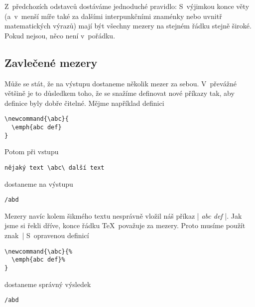 \documentclass[oldcsbabel]{csbulletin}
\def\emph#1{{\sl#1\/}}
\begin{document}
Z~předchozích odstavců dostáváme jednoduché pravidlo: S~výjimkou konce věty (a~v~menší míře také za dalšími interpunkčními znaménky nebo uvnitř matematických výrazů) mají být všechny mezery na stejném řádku stejně široké. Pokud nejsou, něco není v~pořádku.

\subsection{Zavlečené mezery}

Může se stát, že na výstupu dostaneme několik mezer za sebou. V~převážné většině je to důsledkem toho, že se snažíme definovat nové příkazy tak, aby definice byly dobře čitelné. Mějme například definici
\begin{Verbatim}
\newcommand{\abc}{
  \emph{abc def}
}
\end{Verbatim}
Potom při vstupu
\begin{Verbatim}
nějaký text \abc\ další text
\end{Verbatim}
dostaneme na výstupu
\begingroup
\newcommand{\abc}{
  \emph{abc def}
}%
\def\abd{\hbox{\rm
nějaký text \abc\ další text
  \unskip}}%
\begin{Verbatim}[commandchars=/()]
/abd
\end{Verbatim}
\endgroup
\noindent
Mezery navíc kolem šikmého textu nesprávně vložil náš příkaz |\abc|. Jak jsme si řekli dříve, konce řádku \TeX\ považuje za mezery. Proto musíme použít znak~|%
S~opravenou definicí
\begin{Verbatim}
\newcommand{\abc}{%
  \emph{abc def}%
}
\end{Verbatim}
dostaneme správný výsledek
\begingroup
\newcommand{\abc}{%
  \emph{abc def}%
}%
\def\abd{\hbox{\rm
nějaký text \abc\ další text
  \unskip}}%
\begin{Verbatim}[commandchars=/()]
/abd
\end{Verbatim}
\endgroup
\end{document}
